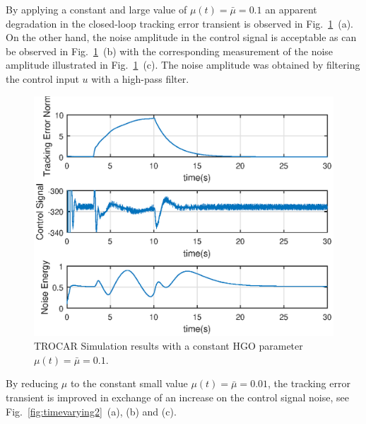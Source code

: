 \documentclass[letterpaper, 10 pt, conference]{ieeeconf}  %
\theoremstyle{plain}
\theoremstyle{definition}
\theoremstyle{remark}
\begin{document}
By applying a constant and large value of $\mu(t)=\bar{\mu}\!=\!0.1$ an apparent degradation in the closed-loop tracking error transient is observed in Fig.~\ref{fig:timevarying1}~(a). On the other hand, the noise amplitude in the control signal is acceptable as can be observed in Fig.~\ref{fig:timevarying1}~(b) with the corresponding measurement of the noise amplitude illustrated in Fig.~\ref{fig:timevarying1}~(c). The noise amplitude was obtained by filtering the control input $u$ with a high-pass filter. 
%
\begin{figure}[h!]
\begin{center}
\includegraphics[width = 13cm]{Figs/mu0dot1-30sec.eps}
\caption{TROCAR Simulation results with a constant HGO parameter $\mu(t)=\bar{\mu}\!=\!0.1$.}
\label{fig:timevarying1}
\end{center}
\end{figure}
%
By reducing $\mu$ to the constant small value $\mu(t)=\bar{\mu}\!=\!0.01$, the  tracking error transient is improved in exchange of an increase on the control signal noise, see  Fig.~\ref{fig:timevarying2}~(a), (b) and (c).
%
\end{document}
